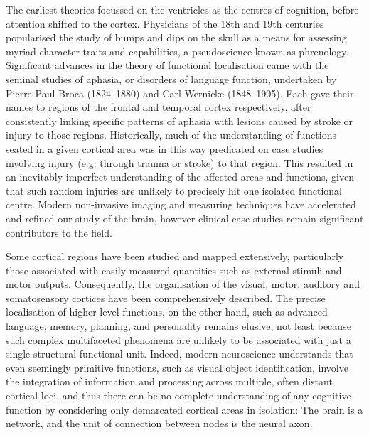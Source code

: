 \documentclass[12pt,phd,a4paper,twoside]{ucl_thesis}
\providecommand{\DIFaddtex}[1]{{\protect\color{blue} \sf #1}} %
\providecommand{\DIFaddbegin}{} %
\providecommand{\DIFaddend}{} %
\providecommand{\DIFadd}[1]{\texorpdfstring{\DIFaddtex{#1}}{#1}} %
\newcommand{\DIFaddincludegraphics}[2][]{{\color{blue}\fbox{\DIFOincludegraphics[#1]{#2}}}} %
\DeclareRobustCommand{\DIFaddbegin}{\DIFOaddbegin \let\includegraphics\DIFaddincludegraphics} %
\DeclareRobustCommand{\DIFaddend}{\DIFOaddend \let\includegraphics\DIFOincludegraphics} %
\begin{document}
The earliest theories focussed on the ventricles as the centres of cognition, before attention shifted to the cortex\autocite{Folzenlogen2019}.
Physicians of the 18th and 19th centuries popularised the study of bumps and dips on the skull as a means for assessing myriad character traits and capabilities, a pseudoscience known as phrenology.
Significant advances in the theory of functional localisation came with the seminal studies of aphasia, or disorders of language function, undertaken by Pierre Paul Broca (1824--1880) and Carl Wernicke (1848--1905).
Each gave their names to regions of the frontal and temporal cortex respectively, after consistently linking specific patterns of aphasia with lesions caused by stroke or injury to those regions.
Historically, much of the understanding of functions seated in a given cortical area was in this way predicated on case studies involving injury (e.g. through trauma or stroke) to that region.
This resulted in \DIFaddbegin \DIFadd{an }\DIFaddend inevitably imperfect understanding of the affected areas and functions, given that such random injuries are unlikely to precisely hit one isolated functional centre.
Modern non-invasive imaging and measuring techniques have accelerated and refined our study of the brain, however clinical case studies remain significant contributors to the field.

Some cortical regions have been studied and mapped extensively, particularly those associated with easily measured quantities such as external stimuli and motor outputs.
Consequently, the organisation of the visual, motor, auditory and somatosensory cortices have been comprehensively described.
The precise localisation of higher-level functions, on the other hand, such as advanced language, memory, planning, and personality remains elusive, not least because such complex multifaceted phenomena are unlikely to be associated with just a single structural-functional unit\autocite{Catani2007}.
Indeed, modern neuroscience understands that even seemingly primitive functions, such as visual object identification, involve the integration of information and processing across multiple, often distant cortical loci\autocite{ffytche2005}, and thus there can be no complete understanding of any cognitive function by considering only demarcated cortical areas in isolation:
The brain is a network, and the unit of connection between nodes is the neural axon.
\DIFaddbegin 
\end{document}
